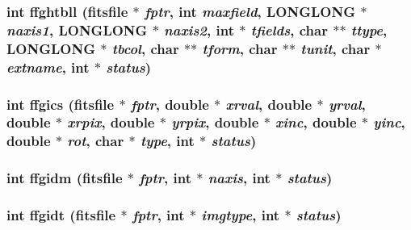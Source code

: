 \subsubsection{\setlength{\rightskip}{0pt plus 5cm}int ffghtbll (\bf{fitsfile} $\ast$ {\em fptr}, int {\em maxfield}, \bf{LONGLONG} $\ast$ {\em naxis1}, \bf{LONGLONG} $\ast$ {\em naxis2}, int $\ast$ {\em tfields}, char $\ast$$\ast$ {\em ttype}, \bf{LONGLONG} $\ast$ {\em tbcol}, char $\ast$$\ast$ {\em tform}, char $\ast$$\ast$ {\em tunit}, char $\ast$ {\em extname}, int $\ast$ {\em status})}\label{test_2shm__client_2fitsio_8h_62e73d788b8463ca174a441efd62c055}


\subsubsection{\setlength{\rightskip}{0pt plus 5cm}int ffgics (\bf{fitsfile} $\ast$ {\em fptr}, double $\ast$ {\em xrval}, double $\ast$ {\em yrval}, double $\ast$ {\em xrpix}, double $\ast$ {\em yrpix}, double $\ast$ {\em xinc}, double $\ast$ {\em yinc}, double $\ast$ {\em rot}, char $\ast$ {\em type}, int $\ast$ {\em status})}\label{test_2shm__client_2fitsio_8h_e41ae6ec4d4f1df61ce26ecc9d558fcb}


\subsubsection{\setlength{\rightskip}{0pt plus 5cm}int ffgidm (\bf{fitsfile} $\ast$ {\em fptr}, int $\ast$ {\em naxis}, int $\ast$ {\em status})}\label{test_2shm__client_2fitsio_8h_2faefcdb1176d17c8159464da5f4fe3f}


\subsubsection{\setlength{\rightskip}{0pt plus 5cm}int ffgidt (\bf{fitsfile} $\ast$ {\em fptr}, int $\ast$ {\em imgtype}, int $\ast$ {\em status})}\label{test_2shm__client_2fitsio_8h_3a8c6b776e15fb6a1ced2ac459366825}


